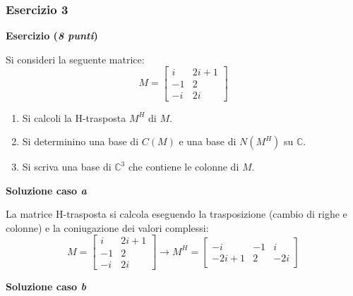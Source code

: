 \documentclass[a4paper]{article}
\begin{document}
	\subsubsection{Esercizio 3}
	
	\textcolor{Red3}{\textbf{Esercizio (\emph{8 punti})}}\newline
	
	\noindent
	Si consideri la seguente matrice:
	\begin{equation*}
		M = \begin{bmatrix}
			i & 2i+1 	\\
			-1 & 2		\\
			-i & 2i
		\end{bmatrix}
	\end{equation*}
	\begin{enumerate}[label=(\alph*)]
		\item Si calcoli la H-trasposta $M^{H}$ di $M$.
		
		\item Si determinino una base di $C\left(M\right)$ e una base di $N\left(M^{H}\right)$ su $\mathbb{C}$.
		
		\item Si scriva una base di $\mathbb{C}^{3}$ che contiene le colonne di $M$.
	\end{enumerate}
	
	\noindent
	\textcolor{Green4}{\textbf{Soluzione caso \emph{a}}}\newline
	
	\noindent
	La matrice H-trasposta si calcola eseguendo la trasposizione (cambio di righe e colonne) e la coniugazione dei valori complessi:
	\begin{equation*}
		M = \begin{bmatrix}
			i & 2i+1 	\\
			-1 & 2		\\
			-i & 2i
		\end{bmatrix} \longrightarrow M^{H} = \begin{bmatrix}
			-i		& -1	& i		\\
			-2i+1	&  2	& -2i
		\end{bmatrix}
	\end{equation*}

	\noindent
	\textcolor{Green4}{\textbf{Soluzione caso \emph{b}}}\newline
	
\end{document}
